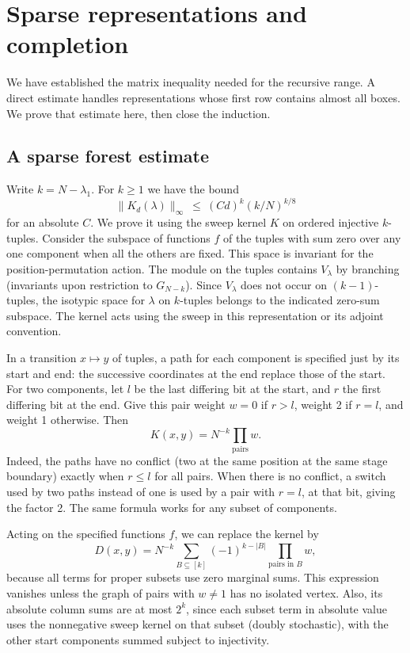 \section{Sparse representations and completion}\label{sec:completion}
We have established the matrix inequality needed for the recursive range. A direct estimate handles representations whose first row contains almost all boxes. We prove that estimate here, then close the induction.
\subsection{A sparse forest estimate}
\label{ten:weighted:part:21}
Write \(k=N-\lambda_1\). For \(k\ge 1\) we have the bound
\begin{equation}
 \|K_d(\lambda)\|_\infty \ \le\ (C d)^k (k/N)^{k/8}                                                   \label{ten:weighted:eq:1}
\end{equation}
for an absolute \(C\). We prove it using the sweep kernel \(K\) on ordered injective \(k\)-tuples. Consider the subspace of functions \(f\) of the tuples with sum zero over any one component when all the others are fixed. This space is invariant for the position-permutation action. The module on the tuples contains \(V_\lambda\) by branching (invariants upon restriction to \(G_{N-k}\)). Since \(V_\lambda\) does not occur on \((k-1)\)-tuples, the isotypic space for \(\lambda\) on \(k\)-tuples belongs to the indicated zero-sum subspace. The kernel acts using the sweep in this representation or its adjoint convention.

In a transition \(x\mapsto y\) of tuples, a path for each component is specified just by its start and end: the successive coordinates at the end replace those of the start. For two components, let \(l\) be the last differing bit at the start, and \(r\) the first differing bit at the end. Give this pair weight \(w=0\) if \(r>l\), weight 2 if \(r=l\), and weight 1 otherwise. Then
\[
 K(x,y)=N^{-k}\prod_{\text{pairs}}w.
\]
Indeed, the paths have no conflict (two at the same position at the same stage boundary) exactly when \(r\le l\) for all pairs. When there is no conflict, a switch used by two paths instead of one is used by a pair with \(r=l\), at that bit, giving the factor 2. The same formula works for any subset of components.

Acting on the specified functions \(f\), we can replace the kernel by
\[
 D(x,y)=N^{-k}\sum_{B\subseteq [k]}(-1)^{k-|B|}\prod_{\text{pairs in }B}w,
\]
because all terms for proper subsets use zero marginal sums. This expression vanishes unless the graph of pairs with \(w\ne 1\) has no isolated vertex. Also, its absolute column sums are at most \(2^k\), since each subset term in absolute value uses the nonnegative sweep kernel on that subset (doubly stochastic), with the other start components summed subject to injectivity.

